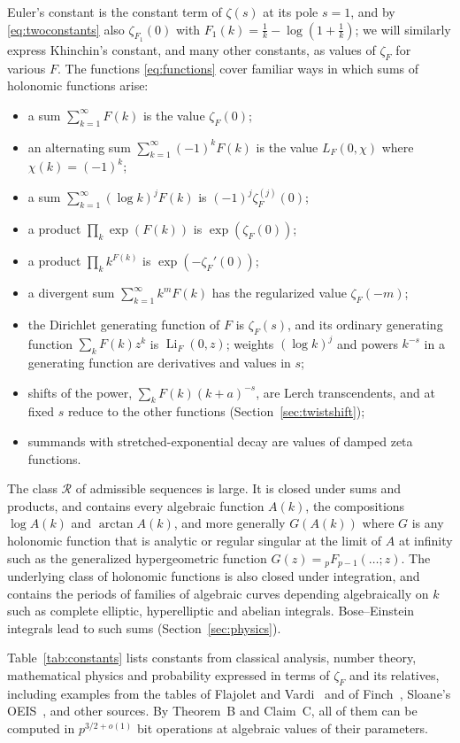 \documentclass[11pt,reqno]{amsart}
\theoremstyle{definition}
\theoremstyle{remark}
\newcommand{\Li}{\operatorname{Li}}
\newcommand{\Reg}{\mathcal{R}}
\begin{document}
Euler's constant is the constant term of $\zeta(s)$ at its pole $s = 1$, and by \eqref{eq:twoconstants} also
$\zeta_{F_1}(0)$ with $F_1(k) = \frac1k - \log(1+\frac1k)$; we will similarly express Khinchin's constant, and many other
constants, as values of $\zeta_F$ for various $F$. The functions \eqref{eq:functions} cover familiar ways in which sums of holonomic functions arise:
\begin{itemize}
\item a sum $\sum_{k=1}^{\infty} F(k)$ is the value $\zeta_F(0)$;
\item an alternating sum $\sum_{k=1}^{\infty} (-1)^k F(k)$ is the value $L_F(0, \chi)$ where $\chi(k) = (-1)^k$;
\item a sum $\sum_{k=1}^{\infty}(\log k)^jF(k)$ is $(-1)^j\zeta_F^{(j)}(0)$;
\item a product $\prod_k \exp(F(k))$ is $\exp(\zeta_F(0))$;
\item a product $\prod_k k^{F(k)}$ is $\exp(-\zeta_F'(0))$;
\item a divergent sum $\sum_{k=1}^{\infty} k^m F(k)$ has the regularized value $\zeta_F(-m)$;
\item the Dirichlet generating function of $F$ is $\zeta_F(s)$, and its ordinary generating
function $\sum_kF(k)z^k$ is $\Li_F(0,z)$; weights $(\log k)^j$ and powers $k^{-s}$ in a generating function are
derivatives and values in $s$;
\item shifts of the power, $\sum_kF(k)(k+a)^{-s}$, are Lerch transcendents, and at fixed $s$ reduce to the other
functions (Section~\ref{sec:twistshift});
\item summands with stretched-exponential decay are values of damped zeta functions.
\end{itemize}

The class $\Reg$ of admissible sequences is large. It is closed under sums and products, and
contains every algebraic function $A(k)$,
the compositions $\log A(k)$ and $\arctan A(k)$,
and more generally $G(A(k))$ where $G$ is any holonomic function that is
analytic or regular singular at the limit of $A$ at infinity
such as the generalized hypergeometric function $G(z) = {}_pF_{p-1}(\ldots; z)$.
The underlying class of holonomic functions is
also closed under integration, and contains the periods of
families of algebraic curves depending algebraically on $k$ such as complete elliptic, hyperelliptic and abelian integrals.
Bose--Einstein integrals lead to such sums (Section~\ref{sec:physics}).

Table~\ref{tab:constants} lists constants from classical analysis, number theory, mathematical physics and probability expressed in terms of $\zeta_F$ and its relatives, including examples from the tables of Flajolet and Vardi~\cite{FV96} and of Finch~\cite{Fin03},
Sloane's OEIS~\cite{OEIS}, and other sources. By Theorem~B and Claim~C, all of them can be computed in
$p^{3/2+o(1)}$ bit operations at algebraic values of their parameters.
\end{document}
